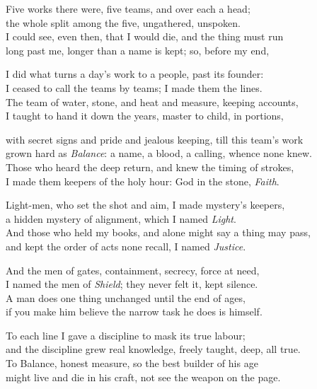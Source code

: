 \begin{founder}
Five works there were, five teams, and over each a head;\\
the whole split among the five, ungathered, unspoken.\\
I could see, even then, that I would die, and the thing must run\\
long past me, longer than a name is kept; so, before my end,\\
\medskip

I did what turns a day's work to a people, past its founder:\\
I ceased to call the teams by teams; I made them the lines.\\
The team of water, stone, and heat and measure, keeping accounts,\\
I taught to hand it down the years, master to child, in portions,\\
\medskip

with secret signs and pride and jealous keeping, till this team's work\\
grown hard as \emph{Balance}: a name, a blood, a calling, whence none knew.\\
Those who heard the deep return, and knew the timing of strokes,\\
I made them keepers of the holy hour: God in the stone, \emph{Faith}.\\
\medskip

Light-men, who set the shot and aim, I made mystery's keepers,\\
a hidden mystery of alignment, which I named \emph{Light}.\\
And those who held my books, and alone might say a thing may pass,\\
and kept the order of acts none recall, I named \emph{Justice}.\\
\medskip

And the men of gates, containment, secrecy, force at need,\\
I named the men of \emph{Shield}; they never felt it, kept silence.\\
A man does one thing unchanged until the end of ages,\\
if you make him believe the narrow task he does is himself.\\
\medskip

To each line I gave a discipline to mask its true labour;\\
and the discipline grew real knowledge, freely taught, deep, all true.\\
To Balance, honest measure, so the best builder of his age\\
might live and die in his craft, not see the weapon on the page.\\
\medskip


\end{founder}
